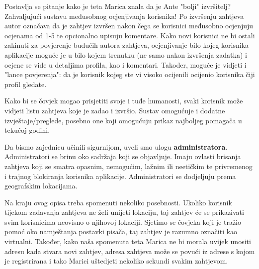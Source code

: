 	Postavlja se pitanje kako je teta Marica znala da je Ante "bolji" izvršitelj? Zahvaljujući sustavu međusobnog ocjenjivanja korisnika! Po izvršenju zahtjeva autor označava da je zahtjev izvršen nakon čega se korisnici međusobno ocjenjuju ocjenama od 1-5 te opcionalno upisuju komentare. Kako novi korisnici ne bi ostali zakinuti za povjerenje budućih autora zahtjeva, ocjenjivanje bilo kojeg korisnika aplikacije moguće je u bilo kojem trenutku (ne samo nakon izvršenja zadatka) i ocjene se vide u detaljima profila, kao i komentari. Također, moguće je vidjeti i
	"lance povjerenja": da je korisnik kojeg ste vi visoko ocijenili ocijenio korisnika
	čiji profil gledate.
	
	Kako bi se čovjek mogao prisjetiti svoje i tuđe humanosti, svaki korisnik može vidjeti listu zahtjeva koje je zadao i izvršio. Sustav
	omogućuje i dodatne izvještaje/preglede, posebno one koji omogućuju
	prikaz najboljeg pomagača u tekućoj godini.
	
	Da bismo zajednicu učinili sigurnijom, uveli smo ulogu \textbf{administratora}. Administratori se brinu oko sadržaja koji se objavljuje. Imaju ovlasti
	brisanja zahtjeva koji se smatra opasnim, nemogućim, lažnim ili neetičkim te
	privremenog i trajnog blokiranja korisnika aplikacije. Administratori se
	dodjeljuju prema geografskim lokacijama. 
	
	Na kraju ovog opisa treba spomenuti nekoliko posebnosti. Ukoliko korisnik tijekom zadavanja zahtjeva ne želi unijeti lokaciju, taj zahtjev će se prikazivati svim korisnicima neovisno o njihovoj lokaciji. Sjetimo se čovjeka koji je tražio pomoć oko namještanja postavki pisača, taj zahtjev je razumno označiti kao virtualni.
	Također, kako naša spomenuta teta Marica ne bi morala uvijek unositi adresu kada stvara novi zahtjev, adresa zahtjeva može se povući iz adrese s kojom je registrirana i tako Marici uštedjeti nekoliko sekundi svakim zahtjevom.
\eject


